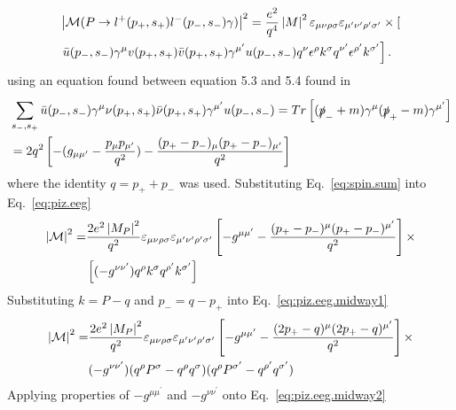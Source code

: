 \begin{align}\label{eq:piz.eeg}
&\left|{\cal M}(P\to l^+(p_+,s_+)l^-(p_-,s_-) \gamma)\right|^2 =  \frac{e^2}{q^4} \left|M\right|^2  \varepsilon_{\mu\nu\rho\sigma}\varepsilon_{\mu^{\prime}\nu^{\prime}\rho^{\prime}\sigma^{\prime}}   \nonumber \times \left[\right.
\\ & \left.\bar u(p_-,s_-) \gamma^\mu v(p_+,s_+) \bar v(p_+,s_+) \gamma^{\mu^{\prime}}  u(p_-,s_-) q^\nu \epsilon^\rho k^\sigma q^{\nu^{\prime}} \epsilon^{\rho^{\prime}} k^{\sigma^{\prime}}\right] .
%
\end{align}
using an equation found between equation 5.3 and 5.4 found in~\cite{peskin}
\begin{align}\label{eq:spin.sum}
& \sum\limits_{s_{-},s_{+}}^{} \bar{u}(p_{-},s_{-})\gamma^{\mu}\nu(p_{+},s_{+})\bar{\nu}(p_{+},s_{+})\gamma^{\mu^{\prime}}u(p_{-},s_{-}) = Tr\left[ (\slashed{p}_- +m)\gamma^{\mu} (\slashed{p}_+-m)\gamma^{\mu^{\prime}} \right]\nonumber \\ & =2q^{2}\left[-(g_{\mu\mu^{\prime}}-\frac{p_{\mu}p_{\mu^{\prime}}}{q^{2}} ) - \frac{(p_{+} - p_{-})_{\mu}(p_{+} - p_{-})_{\mu^{\prime}}}{q^{2}}\right]
\end{align}
where the identity $q = p_+ + p_-$ was used.
Substituting Eq.~\ref{eq:spin.sum} into Eq.~\ref{eq:piz.eeg}
\begin{align} \label{eq:piz.eeg.midway1}
\left|{\cal M}\right|^{2} = &  \frac{2e^{2}\left|M_{P}\right|^{2}}{q^{2}}\varepsilon_{\mu\nu\rho\sigma}\varepsilon_{\mu^{\prime}\nu^{\prime}\rho^{\prime}\sigma^{\prime}}\left[-g^{\mu\mu^{\prime}} - \frac{(p_{+} - p_{-})^{\mu}(p_{+} - p_{-})^{\mu^{\prime}}}{q^{2}}\right]
\times \nonumber \\ &\left[ (-g^{\nu\nu^{\prime}})q^{\rho}k^{\sigma}q^{\rho^{\prime}}k^{\sigma^{\prime}} \right]
\end{align}
Substituting $k = P - q$ and $p_- = q - p_+$ into Eq.~\ref{eq:piz.eeg.midway1}
\begin{align} \label{eq:piz.eeg.midway2}
\left|{\cal M}\right|^{2} = & \frac{2e^{2}\left|M_{P}\right|^{2}}{q^{2}}\varepsilon_{\mu\nu\rho\sigma}\varepsilon_{\mu^{\prime}\nu^{\prime}\rho^{\prime}\sigma^{\prime}}\left[-g^{\mu\mu^{\prime}} - \frac{(2p_{+} - q)^{\mu}(2p_{+} - q)^{\mu^{\prime}}}{q^{2}}\right] \times \nonumber \\ &  (-g^{\nu\nu^{\prime}})      
(q^{\rho}P^{\sigma} - q^{\rho}q^{\sigma}) (q^{\rho}P^{\sigma^{\prime}} - q^{\rho^{\prime}}q^{\sigma^{\prime}})
\end{align}
Applying properties of $-g^{\mu\mu^{\prime}}$ and $-g^{\nu\nu^{\prime}}$ onto Eq.~\ref{eq:piz.eeg.midway2}
